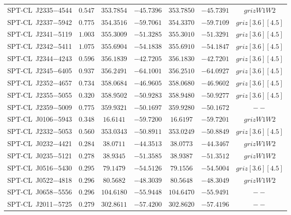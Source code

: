 \begin{table}
{\begin{tabular}{ccccccc}
    SPT-CL~J2335$-$4544    &$ 0.547 $    &$ 353.7854 $    &$ -45.7396 $     &$ 353.7850 $    &$ -45.7391 $     & $grizW1W2$    \\ 
    SPT-CL~J2337$-$5942    &$ 0.775 $    &$ 354.3516 $    &$ -59.7061 $     &$ 354.3370 $    &$ -59.7109 $     & $griz[3.6][4.5]$    \\ 
    SPT-CL~J2341$-$5119    &$ 1.003 $    &$ 355.3009 $    &$ -51.3285 $     &$ 355.3010 $    &$ -51.3291 $     & $griz[3.6][4.5]$    \\ 
    SPT-CL~J2342$-$5411    &$ 1.075 $    &$ 355.6904 $    &$ -54.1838 $     &$ 355.6910 $    &$ -54.1847 $     & $griz[3.6][4.5]$    \\ 
    SPT-CL~J2344$-$4243    &$ 0.596 $    &$ 356.1839 $    &$ -42.7205 $     &$ 356.1830 $    &$ -42.7201 $     & $griz[3.6][4.5]$    \\ 
    SPT-CL~J2345$-$6405    &$ 0.937 $    &$ 356.2491 $    &$ -64.1001 $     &$ 356.2510 $    &$ -64.0927 $     & $griz[3.6][4.5]$    \\ 
    SPT-CL~J2352$-$4657    &$ 0.734 $    &$ 358.0684 $    &$ -46.9605 $     &$ 358.0680 $    &$ -46.9602 $     & $griz[3.6][4.5]$    \\ 
    SPT-CL~J2355$-$5055    &$ 0.320 $    &$ 358.9502 $    &$ -50.9283 $     &$ 358.9480 $    &$ -50.9277 $     & $griz[3.6][4.5]$    \\ 
    SPT-CL~J2359$-$5009    &$ 0.775 $    &$ 359.9321 $    &$ -50.1697 $     &$ 359.9280 $    &$ -50.1672 $     & $--$    \\ 
    SPT-CL~J0106$-$5943    &$ 0.348 $    &$ 16.6141 $    &$ -59.7200 $     &$ 16.6197 $    &$ -59.7201 $     & $grizW1W2$    \\ 
    SPT-CL~J2332$-$5053    &$ 0.560 $    &$ 353.0343 $    &$ -50.8911 $     &$ 353.0249 $    &$ -50.8849 $     & $griz[3.6][4.5]$    \\ 
    SPT-CL~J0232$-$4421    &$ 0.284 $    &$ 38.0711 $    &$ -44.3513 $     &$ 38.0773 $    &$ -44.3467 $     & $grizW1W2$    \\ 
    SPT-CL~J0235$-$5121    &$ 0.278 $    &$ 38.9345 $    &$ -51.3585 $     &$ 38.9387 $    &$ -51.3512 $     & $grizW1W2$    \\ 
    SPT-CL~J0516$-$5430    &$ 0.295 $    &$ 79.1479 $    &$ -54.5126 $     &$ 79.1556 $    &$ -54.5004 $     & $griz[3.6][4.5]$    \\ 
    SPT-CL~J0522$-$4818    &$ 0.296 $    &$ 80.5682 $    &$ -48.3039 $     &$ 80.5648 $    &$ -48.3049 $     & $grizW1W2$    \\ 
    SPT-CL~J0658$-$5556    &$ 0.296 $    &$ 104.6180 $    &$ -55.9448 $     &$ 104.6470 $    &$ -55.9491 $     & $--$    \\ 
    SPT-CL~J2011$-$5725    &$ 0.279 $    &$ 302.8611 $    &$ -57.4200 $     &$ 302.8620 $    &$ -57.4196 $     & $--$    \\ 

    \end{tabular}
    }
    \end{table}